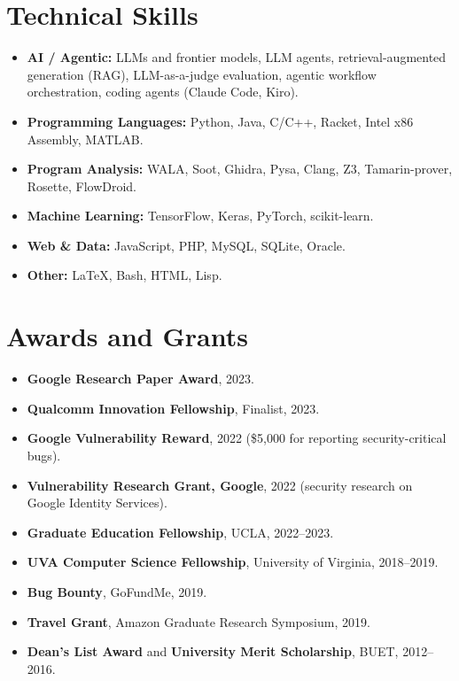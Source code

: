 \documentclass[11pt,letterpaper]{article}
\begin{document}
\section{Technical Skills}
\begin{itemize}
  \item \textbf{AI / Agentic:} LLMs and frontier models, LLM agents, retrieval-augmented
        generation (RAG), LLM-as-a-judge evaluation, agentic workflow orchestration,
        coding agents (Claude Code, Kiro).
  \item \textbf{Programming Languages:} Python, Java, C/C++, Racket, Intel x86 Assembly, MATLAB.
  \item \textbf{Program Analysis:} WALA, Soot, Ghidra, Pysa, Clang, Z3, Tamarin-prover,
        Rosette, FlowDroid.
  \item \textbf{Machine Learning:} TensorFlow, Keras, PyTorch, scikit-learn.
  \item \textbf{Web \& Data:} JavaScript, PHP, MySQL, SQLite, Oracle.
  \item \textbf{Other:} \LaTeX{}, Bash, HTML, Lisp.
\end{itemize}

\section{Awards and Grants}
\begin{itemize}
  \item \textbf{Google Research Paper Award}, 2023.
  \item \textbf{Qualcomm Innovation Fellowship}, Finalist, 2023.
  \item \textbf{Google Vulnerability Reward}, 2022 (\$5{,}000 for reporting security-critical bugs).
  \item \textbf{Vulnerability Research Grant, Google}, 2022 (security research on Google Identity Services).
  \item \textbf{Graduate Education Fellowship}, UCLA, 2022--2023.
  \item \textbf{UVA Computer Science Fellowship}, University of Virginia, 2018--2019.
  \item \textbf{Bug Bounty}, GoFundMe, 2019.
  \item \textbf{Travel Grant}, Amazon Graduate Research Symposium, 2019.
  \item \textbf{Dean's List Award} and \textbf{University Merit Scholarship}, BUET, 2012--2016.
\end{itemize}
\end{document}
